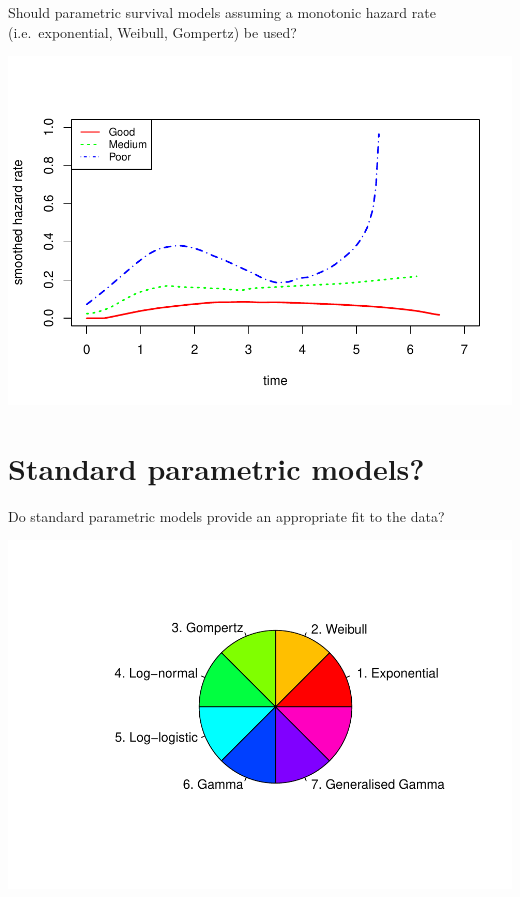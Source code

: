 \documentclass[]{article}
\begin{document}
Should parametric survival models assuming a monotonic hazard rate
(i.e.~exponential, Weibull, Gompertz) be used?

\begin{flushleft}\includegraphics{images/plot_hr-1} \end{flushleft}

\newpage

\section{Standard parametric models?}\label{standard-parametric-models}

Do standard parametric models provide an appropriate fit to the data?

\begin{flushleft}\includegraphics{images/plot_parametric-1} \end{flushleft}
\end{document}
